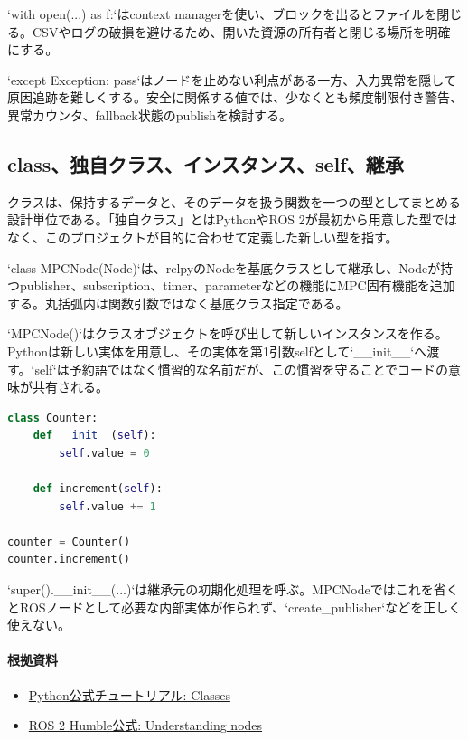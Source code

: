 \documentclass[a4paper,11pt]{article}
\begin{document}
`with open(...) as f:`はcontext managerを使い、ブロックを出るとファイルを閉じる。CSVやログの破損を避けるため、開いた資源の所有者と閉じる場所を明確にする。


`except Exception: pass`はノードを止めない利点がある一方、入力異常を隠して原因追跡を難しくする。安全に関係する値では、少なくとも頻度制限付き警告、異常カウンタ、fallback状態のpublishを検討する。



\subsection{class、独自クラス、インスタンス、self、継承}
クラスは、保持するデータと、そのデータを扱う関数を一つの型としてまとめる設計単位である。「独自クラス」とはPythonやROS 2が最初から用意した型ではなく、このプロジェクトが目的に合わせて定義した新しい型を指す。


`class MPCNode(Node)`は、rclpyのNodeを基底クラスとして継承し、Nodeが持つpublisher、subscription、timer、parameterなどの機能にMPC固有機能を追加する。丸括弧内は関数引数ではなく基底クラス指定である。


`MPCNode()`はクラスオブジェクトを呼び出して新しいインスタンスを作る。Pythonは新しい実体を用意し、その実体を第1引数selfとして`\_\_init\_\_`へ渡す。`self`は予約語ではなく慣習的な名前だが、この慣習を守ることでコードの意味が共有される。


\begin{lstlisting}[language=python]
class Counter:
    def __init__(self):
        self.value = 0

    def increment(self):
        self.value += 1

counter = Counter()
counter.increment()
\end{lstlisting}


`super().\_\_init\_\_(...)`は継承元の初期化処理を呼ぶ。MPCNodeではこれを省くとROSノードとして必要な内部実体が作られず、`create\_publisher`などを正しく使えない。

\paragraph{根拠資料}
\begin{itemize}[leftmargin=1.6em]
\item \href{https://docs.python.org/3/tutorial/classes.html}{Python公式チュートリアル: Classes}
\item \href{https://docs.ros.org/en/humble/Tutorials/Beginner-CLI-Tools/Understanding-ROS2-Nodes/Understanding-ROS2-Nodes.html}{ROS 2 Humble公式: Understanding nodes}
\end{itemize}
\end{document}

